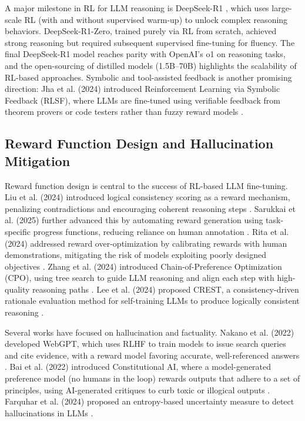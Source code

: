 A major milestone in RL for LLM reasoning is DeepSeek-R1 \citep{liang2025}, which uses large-scale RL (with and without supervised warm-up) to unlock complex reasoning behaviors. DeepSeek-R1-Zero, trained purely via RL from scratch, achieved strong reasoning but required subsequent supervised fine-tuning for fluency. The final DeepSeek-R1 model reaches parity with OpenAI's o1 on reasoning tasks, and the open-sourcing of distilled models (1.5B–70B) highlights the scalability of RL-based approaches. Symbolic and tool-assisted feedback is another promising direction: Jha et al. (2024) introduced Reinforcement Learning via Symbolic Feedback (RLSF), where LLMs are fine-tuned using verifiable feedback from theorem provers or code testers rather than fuzzy reward models \citep{jha2024}.

\subsection{Reward Function Design and Hallucination Mitigation}

Reward function design is central to the success of RL-based LLM fine-tuning. Liu et al. (2024) introduced logical consistency scoring as a reward mechanism, penalizing contradictions and encouraging coherent reasoning steps \citep{liu2024}. Sarukkai et al. (2025) further advanced this by automating reward generation using task-specific progress functions, reducing reliance on human annotation \citep{sarukkai2025}. Rita et al. (2024) addressed reward over-optimization by calibrating rewards with human demonstrations, mitigating the risk of models exploiting poorly designed objectives \citep{rita2024}. Zhang et al. (2024) introduced Chain-of-Preference Optimization (CPO), using tree search to guide LLM reasoning and align each step with high-quality reasoning paths \citep{zhang2024}. Lee et al. (2024) proposed CREST, a consistency-driven rationale evaluation method for self-training LLMs to produce logically consistent reasoning \citep{lee2024}.

Several works have focused on hallucination and factuality. Nakano et al. (2022) developed WebGPT, which uses RLHF to train models to issue search queries and cite evidence, with a reward model favoring accurate, well-referenced answers \citep{nakano2022}. Bai et al. (2022) introduced Constitutional AI, where a model-generated preference model (no humans in the loop) rewards outputs that adhere to a set of principles, using AI-generated critiques to curb toxic or illogical outputs \citep{bai2022}. Farquhar et al. (2024) proposed an entropy-based uncertainty measure to detect hallucinations in LLMs \citep{farquhar2024}.

